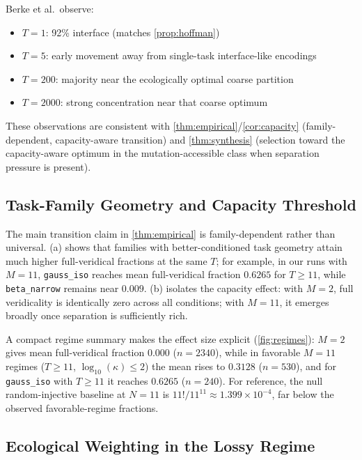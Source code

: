 \documentclass[12pt]{article}
\begin{document}
Berke et al.\ observe:
\begin{itemize}
\item $T = 1$: 92\% interface (matches \cref{prop:hoffman})
\item $T = 5$: early movement away from single-task interface-like encodings
\item $T = 200$: majority near the ecologically optimal coarse partition
\item $T = 2000$: strong concentration near that coarse optimum
\end{itemize}

These observations are consistent with \cref{thm:empirical}/\cref{cor:capacity} (family-dependent, capacity-aware transition) and \cref{thm:synthesis} (selection toward the capacity-aware optimum in the mutation-accessible class when separation pressure is present).

\subsection{Task-Family Geometry and Capacity Threshold}\label{app:geometry}

The main transition claim in \cref{thm:empirical} is family-dependent rather than universal. (a) shows that families with better-conditioned task geometry attain much higher full-veridical fractions at the same $T$; for example, in our runs with $M = 11$, \texttt{gauss\_iso} reaches mean full-veridical fraction $0.6265$ for $T \ge 11$, while \texttt{beta\_narrow} remains near $0.009$. (b) isolates the capacity effect: with $M = 2$, full veridicality is identically zero across all conditions; with $M = 11$, it emerges broadly once separation is sufficiently rich.

A compact regime summary makes the effect size explicit (\cref{fig:regimes}): $M = 2$ gives mean full-veridical fraction $0.000$ ($n = 2340$), while in favorable $M = 11$ regimes ($T \ge 11$, $\log_{10}(\kappa) \le 2$) the mean rises to $0.3128$ ($n = 530$), and for \texttt{gauss\_iso} with $T \ge 11$ it reaches $0.6265$ ($n = 240$). For reference, the null random-injective baseline at $N = 11$ is $11!/11^{11} \approx 1.399 \times 10^{-4}$, far below the observed favorable-regime fractions.

\subsection{Ecological Weighting in the Lossy Regime}\label{app:weighting}
\end{document}
